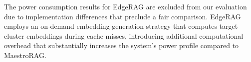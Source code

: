 The power consumption results for EdgeRAG are excluded from our evaluation due to implementation differences that preclude a fair comparison. EdgeRAG employs an on-demand embedding generation strategy that computes target cluster embeddings during cache misses, introducing additional computational overhead that substantially increases the system's power profile compared to MaestroRAG. 



